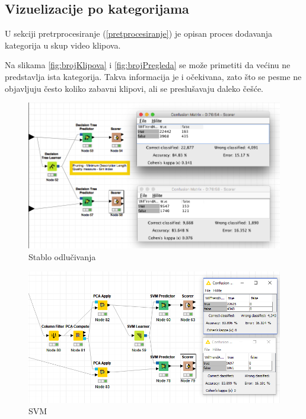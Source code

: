 \documentclass[a4paper]{article}
\theoremstyle{definition}
\begin{document}
\subsection{Vizuelizacije po kategorijama}

U sekciji pretrprocesiranje (\ref{pretprocesiranje}) je opisan proces dodavanja kategorija u skup video klipova.  

Na slikama \ref{fig:brojKlipova} i \ref{fig:brojPregleda} se može primetiti da većinu ne predstavlja ista kategorija. Takva informacija je i očekivana, zato što se pesme ne objavljuju često koliko zabavni klipovi, ali se preslušavaju daleko češće.


\begin{figure}[h!]
\begin{center}
    \includegraphics[width=1\textwidth]{decision_tree.png}
    \caption{Stablo odlučivanja}
\end{center}
\label{fig:stabloOdlucivanja}
\end{figure}

\begin{figure}[h!]
\begin{center}
    \includegraphics[width=1\textwidth]{SVM.png}
    \caption{SVM}
\end{center}
\label{fig:SVM}
\end{figure}
\end{document}
